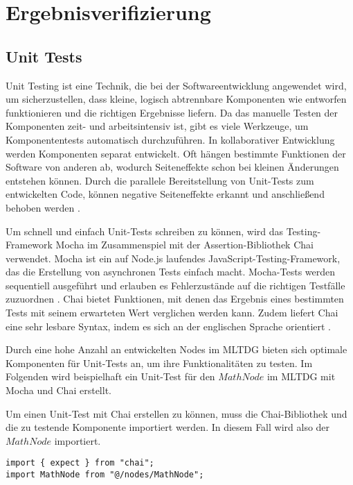 
\chapter{Ergebnisverifizierung}

\section{Unit Tests}

Unit Testing ist eine Technik, die bei der Softwareentwicklung angewendet wird, um sicherzustellen, dass kleine, logisch abtrennbare Komponenten wie entworfen funktionieren und die richtigen Ergebnisse liefern. Da das manuelle Testen der Komponenten zeit- und arbeitsintensiv ist, gibt es viele Werkzeuge, um Komponententests automatisch durchzuführen. In kollaborativer Entwicklung werden Komponenten separat entwickelt. Oft hängen bestimmte Funktionen der Software von anderen ab, wodurch Seiteneffekte schon bei kleinen Änderungen entstehen können. Durch die parallele Bereitstellung von Unit-Tests zum entwickelten Code, können negative Seiteneffekte erkannt und anschließend behoben werden \cite{Dalton2018}.

Um schnell und einfach Unit-Tests schreiben zu können, wird das Testing-Framework Mocha im Zusammenspiel mit der Assertion-Bibliothek Chai verwendet. Mocha ist ein auf Node.js laufendes JavaScript-Testing-Framework, das die Erstellung von asynchronen Tests einfach macht. Mocha-Tests werden sequentiell ausgeführt und erlauben es Fehlerzustände auf die richtigen Testfälle zuzuordnen \cite{mocha}. Chai bietet Funktionen, mit denen das Ergebnis eines bestimmten Tests mit seinem erwarteten Wert verglichen werden kann. Zudem liefert Chai eine sehr lesbare Syntax, indem es sich an der englischen Sprache orientiert \cite{chai}.

Durch eine hohe Anzahl an entwickelten Nodes im \ac{MLTDG} bieten sich optimale Komponenten für Unit-Tests an, um ihre Funktionalitäten zu testen. Im Folgenden wird beispielhaft ein Unit-Test für den $MathNode$ im \ac{MLTDG} mit Mocha und Chai erstellt.

Um einen Unit-Test mit Chai erstellen zu können, muss die Chai-Bibliothek und die zu testende Komponente importiert werden. In diesem Fall wird also der $MathNode$ importiert.

\begin{lstlisting}[caption=Unit-Test: Import,label=unit1]
import { expect } from "chai";
import MathNode from "@/nodes/MathNode";
\end{lstlisting}

